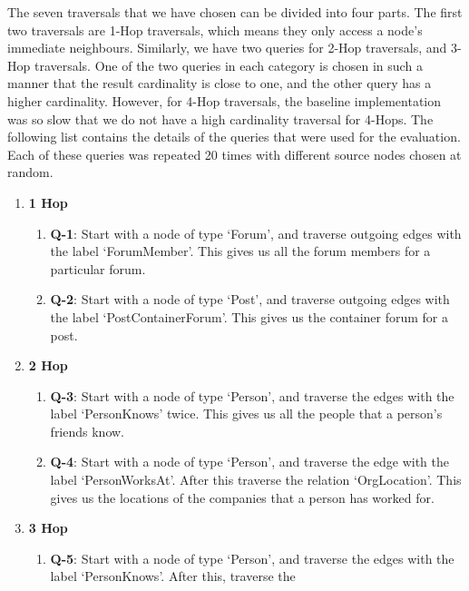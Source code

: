 \smallskip
The seven traversals that we have chosen can be divided into four parts. The
first two traversals are 1-Hop traversals, which means they only access a node's
immediate neighbours. Similarly, we have two queries for 2-Hop traversals, and
3-Hop traversals. One of the two queries in each category is chosen in such a
manner that the result cardinality is close to one, and the other query has a
higher cardinality. However, for 4-Hop traversals, the baseline implementation
was so slow that we do not have a high cardinality traversal for 4-Hops. The
following list contains the details of the queries that were used for the
evaluation. Each of these queries was repeated 20 times with different source
nodes chosen at random.
\begin{enumerate}
    \item \textbf{1 Hop}
        \begin{enumerate}
            \item \textbf{Q-1}: Start with a node of type `Forum', and traverse outgoing
                edges with the label `ForumMember'. This gives us all the forum members for
                a particular forum.
            \item \textbf{Q-2}: Start with a node of type `Post', and traverse outgoing
                edges with the label `PostContainerForum'. This gives us the container forum
                for a post.
        \end{enumerate}
    \item \textbf{2 Hop}
        \begin{enumerate}
            \item \textbf{Q-3}: Start with a node of type `Person', and traverse
                the edges with the label `PersonKnows' twice. This gives us all the
                people that a person's friends know.
            \item \textbf{Q-4}: Start with a node of type `Person', and traverse
                the edge with the label `PersonWorksAt'. After this traverse the
                relation `OrgLocation'. This gives us the locations of the
                companies that a person has worked for.
        \end{enumerate}
    \item \textbf{3 Hop}
        \begin{enumerate}
            \item \textbf{Q-5}: Start with a node of type `Person', and traverse
                the edges with the label `PersonKnows'. After this, traverse the

\end{enumerate}
\end{enumerate}
